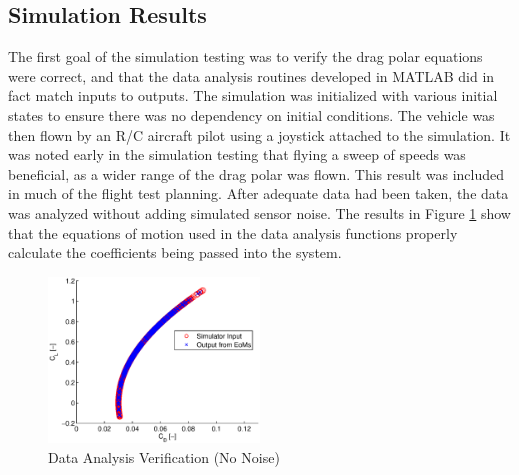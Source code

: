 \subsection*{Simulation Results}
The first goal of the simulation testing was to verify the drag polar equations were correct, and that the data analysis routines developed in MATLAB did in fact match inputs to outputs. The simulation was initialized with various initial states to ensure there was no dependency on initial conditions. The vehicle was then flown by an R/C aircraft pilot using a joystick attached to the simulation. It was noted early in the simulation testing that flying a sweep of speeds was beneficial, as a wider range of the drag polar was flown. This result was included in much of the flight test planning. After adequate data had been taken, the data was analyzed without adding simulated sensor noise. The results in Figure \ref{dragPolarNoNoise} show that the equations of motion used in the data analysis functions properly calculate the coefficients being passed into the system.

\begin{figure}[H]
  \centering
  
    \includegraphics[width=0.5\textwidth]{figures/dragPolarNoNoise.eps}
    \caption{Data Analysis Verification (No Noise)}
        \label{dragPolarNoNoise}
\end{figure}

